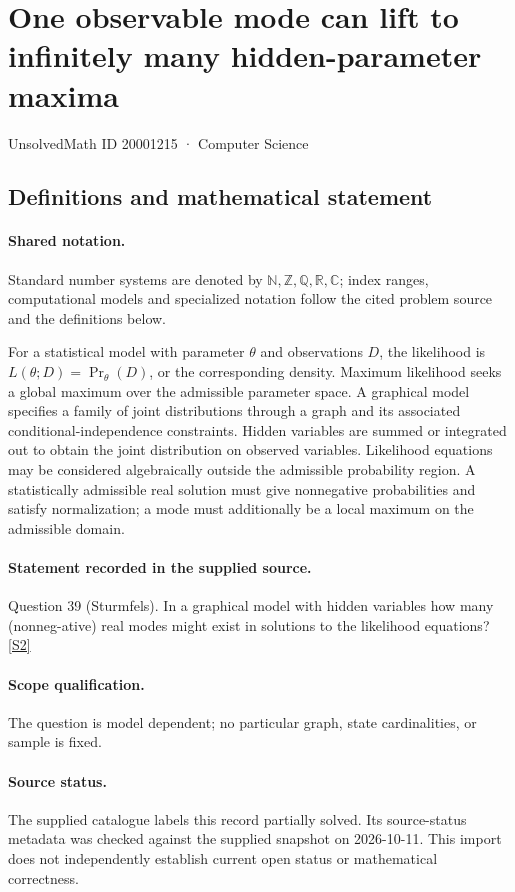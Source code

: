 \documentclass[11pt]{article}
\newcommand{\sref}[2]{\hyperlink{source:#1:#2}{[S#2]}}
\begin{document}
\setcounter{section}{20001214}
\section{One observable mode can lift to infinitely many hidden-parameter maxima}\label{20001215}
{\small\sffamily UnsolvedMath ID 20001215 · Computer Science}
\subsection{Definitions and mathematical statement}

\paragraph{Shared notation.}Standard number systems are denoted by $\mathbb N,\mathbb Z,\mathbb Q,\mathbb R,\mathbb C$; index ranges, computational models and specialized notation follow the cited problem source and the definitions below.


For a statistical model with parameter $\theta$ and observations $D$, the likelihood is $L(\theta;D)=\Pr_\theta(D)$, or the corresponding density. Maximum likelihood seeks a global maximum over the admissible parameter space. A graphical model specifies a family of joint distributions through a graph and its associated conditional-independence constraints. Hidden variables are summed or integrated out to obtain the joint distribution on observed variables. Likelihood equations may be considered algebraically outside the admissible probability region. A statistically admissible real solution must give nonnegative probabilities and satisfy normalization; a mode must additionally be a local maximum on the admissible domain.
\paragraph{Statement recorded in the supplied source.}
Question 39 (Sturmfels). In a graphical model with hidden variables how many (nonneg-ative) real modes might exist in solutions to the likelihood equations? \sref{20001215}{2}
\paragraph{Scope qualification.}
The question is model dependent; no particular graph, state cardinalities, or sample is fixed.
\paragraph{Source status.}
The supplied catalogue labels this record partially solved. Its source-status metadata was checked against the supplied snapshot on 2026-10-11. This import does not independently establish current open status or mathematical correctness.
\end{document}
